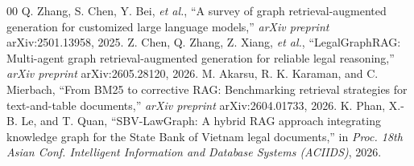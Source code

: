 \documentclass[conference]{IEEEtran}
\begin{document}
\begin{thebibliography}{00}
   Q. Zhang, S. Chen, Y. Bei, \textit{et al.}, ``A survey of graph retrieval-augmented generation for customized large language models,'' \textit{arXiv preprint} arXiv:2501.13958, 2025.
   Z. Chen, Q. Zhang, Z. Xiang, \textit{et al.}, ``LegalGraphRAG: Multi-agent graph retrieval-augmented generation for reliable legal reasoning,'' \textit{arXiv preprint} arXiv:2605.28120, 2026.
   M. Akarsu, R. K. Karaman, and C. Mierbach, ``From BM25 to corrective RAG: Benchmarking retrieval strategies for text-and-table documents,'' \textit{arXiv preprint} arXiv:2604.01733, 2026.
   K. Phan, X.-B. Le, and T. Quan, ``SBV-LawGraph: A hybrid RAG approach integrating knowledge graph for the State Bank of Vietnam legal documents,'' in \textit{Proc. 18th Asian Conf. Intelligent Information and Database Systems (ACIIDS)}, 2026.
\end{thebibliography}
\end{document}
